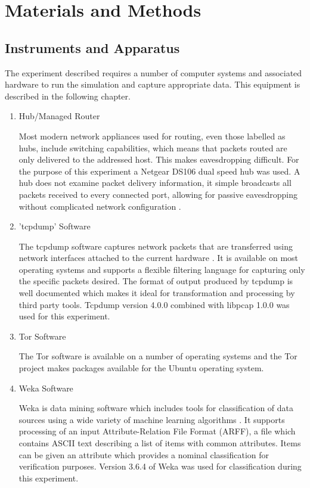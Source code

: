 
\chapter{Materials and Methods}

\section{Instruments and Apparatus}

The experiment described requires a number of computer systems and associated
hardware to run the simulation and capture appropriate data. This equipment is
described in the following chapter.

\begin{enumerate}
  \item Hub/Managed Router

  Most modern network appliances used for routing, even those labelled as hubs,
  include switching capabilities, which means that packets routed are only
  delivered to the addressed host. This makes eavesdropping difficult. For
  the purpose of this experiment a Netgear DS106 dual speed hub was used. A hub
  does not examine packet delivery information, it simple broadcasts all packets
  received to every connected port, allowing for passive eavesdropping without
  complicated network configuration \parencite{website:hub-reference}.

  \item 'tcpdump' Software

  The tcpdump software captures network packets that are transferred using
  network interfaces attached to the current hardware \parencite{:2009cr}.  It is
  available on most operating systems and supports a flexible filtering language
  for capturing only the specific packets desired. The format of output produced
  by tcpdump is well documented \parencite{:nx} which makes it ideal for
  transformation and processing by third party tools. Tcpdump version 4.0.0
  combined with libpcap 1.0.0 was used for this experiment.

  \item Tor Software

  The Tor software is available on a number of operating systems and the Tor
  project makes packages available for the Ubuntu operating system.

  \item Weka Software

  Weka is data mining software which includes tools for classification of data
  sources using a wide variety of machine learning algorithms
  \parencite{Hall:2009p7662}. It supports processing of an input
  Attribute-Relation File Format (ARFF), a file which contains ASCII text
  describing a list of items with common attributes. Items can be given an
  attribute which provides a nominal classification for verification purposes.
  Version 3.6.4 of Weka was used for classification during this experiment.


\end{enumerate}
